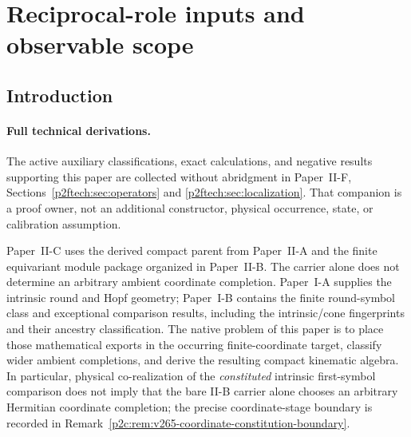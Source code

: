 \documentclass[12pt,a4paper]{article}
\begin{document}
\tableofcontents
\listoftables
\newpage

\section{Reciprocal-role inputs and observable scope}
\label{paper2c:sec:organized-scope}

\subsection{Introduction}
\label{p2c:sec:introduction}

\paragraph{Full technical derivations.}
The active auxiliary classifications, exact calculations, and negative
results supporting this paper are collected without abridgment in
Paper~II-F, Sections~\ref{p2ftech:sec:operators} and
\ref{p2ftech:sec:localization}.
That companion is a proof owner, not an additional constructor,
physical occurrence, state, or calibration assumption.

Paper~II-C uses the derived compact parent from Paper~II-A and the finite
equivariant module package organized in Paper~II-B.  The carrier alone does
not determine an arbitrary ambient coordinate completion.  Paper~I-A supplies the intrinsic round and Hopf geometry; Paper~I-B
contains the finite round-symbol class and exceptional comparison results,
including the intrinsic/cone fingerprints and their ancestry classification.  The native problem of this paper is to place those mathematical
exports in the occurring finite-coordinate target, classify wider ambient
completions, and derive the resulting compact kinematic algebra.  In
particular, physical co-realization of the \emph{constituted} intrinsic
first-symbol comparison does not imply that the bare II-B carrier alone
chooses an arbitrary Hermitian coordinate completion; the precise
coordinate-stage boundary is recorded in
Remark~\ref{p2c:rem:v265-coordinate-constitution-boundary}.
\end{document}
